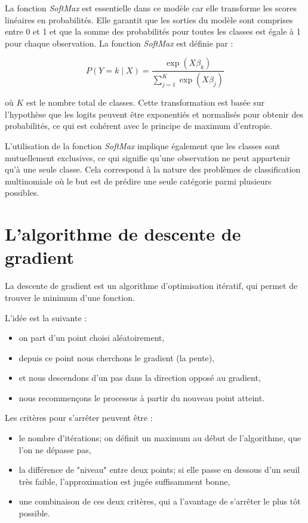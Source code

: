 \documentclass[10pt,french]{report}
\begin{document}
	La fonction \textit{SoftMax} est essentielle dans ce modèle car elle transforme les scores linéaires en probabilités. Elle garantit que les sorties du modèle sont comprises entre 0 et 1 et que la somme des probabilités pour toutes les classes est égale à 1 pour chaque observation. La fonction \textit{SoftMax} est définie par :
	
	\[
	P(Y = k \mid X) = \frac{\exp(X\beta_k)}{\sum_{j=1}^K \exp(X\beta_j)}
	\]
	
	où \( K \) est le nombre total de classes. Cette transformation est basée sur l'hypothèse que les logits peuvent être exponentiés et normalisés pour obtenir des probabilités, ce qui est cohérent avec le principe de maximum d'entropie.
	
	L'utilisation de la fonction \textit{SoftMax} implique également que les classes sont mutuellement exclusives, ce qui signifie qu'une observation ne peut appartenir qu'à une seule classe. Cela correspond à la nature des problèmes de classification multinomiale où le but est de prédire une seule catégorie parmi plusieurs possibles.
	
	\section{L'algorithme de descente de gradient}
	
	La descente de gradient est un algorithme d’optimisation itératif, qui permet de trouver le minimum d'une fonction.
	
	L'idée est la suivante :
	\begin{itemize}
		\item on part d'un point choisi aléatoirement,
		\item depuis ce point nous cherchons le gradient (la pente),
		\item et nous descendons d'un pas dans la direction opposé au gradient,
		\item nous recommençons le processus à partir du nouveau point atteint.
	\end{itemize}
	
	Les critères pour s'arrêter peuvent être :
	\begin{itemize}
		\item le nombre d'itérations; on définit un maximum au début de l'algorithme, que l'on ne dépasse pas,
		\item la différence de "niveau" entre deux points; si elle passe en dessous d'un seuil très faible, l'approximation est jugée suffisamment bonne,
		\item une combinaison de ces deux critères, qui a l'avantage de s'arrêter le plus tôt possible.
	\end{itemize}
	
\end{document}
